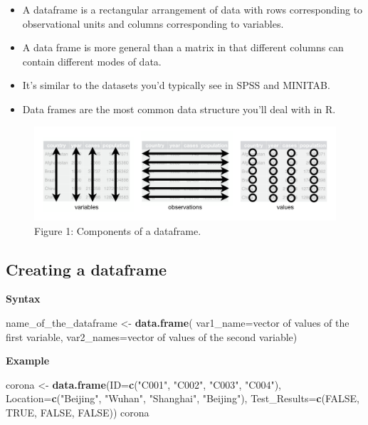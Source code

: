 \documentclass[
]{book}
\newenvironment{Shaded}{\begin{snugshade}}{\end{snugshade}}
\newcommand{\DataTypeTok}[1]{\textcolor[rgb]{0.13,0.29,0.53}{#1}}
\newcommand{\KeywordTok}[1]{\textcolor[rgb]{0.13,0.29,0.53}{\textbf{#1}}}
\newcommand{\NormalTok}[1]{#1}
\newcommand{\OtherTok}[1]{\textcolor[rgb]{0.56,0.35,0.01}{#1}}
\newcommand{\StringTok}[1]{\textcolor[rgb]{0.31,0.60,0.02}{#1}}
\begin{document}
\begin{itemize}
\item
  A dataframe is a rectangular arrangement of data with rows corresponding to observational units and columns corresponding to variables.
\item
  A data frame is more general than a matrix in that different columns can contain different modes of data.
\item
  It's similar to the datasets you'd typically see in SPSS and MINITAB.
\item
  Data frames are the most common data structure you'll deal with in R.
\end{itemize}

\begin{figure}
\centering
\includegraphics{tidy-1.png}
\caption{Figure 1: Components of a dataframe.}
\end{figure}

\hypertarget{creating-a-dataframe}{%
\subsection{Creating a dataframe}\label{creating-a-dataframe}}

\textbf{Syntax}

\begin{Shaded}
\begin{Highlighting}[]
\NormalTok{name_of_the_dataframe <-}\StringTok{ }\KeywordTok{data.frame}\NormalTok{(}
                          \DataTypeTok{var1_name=}\NormalTok{vector of values of the first variable,}
                          \DataTypeTok{var2_names=}\NormalTok{vector of values of the second variable)}
\end{Highlighting}
\end{Shaded}

\textbf{Example}

\begin{Shaded}
\begin{Highlighting}[]
\NormalTok{corona <-}\StringTok{ }\KeywordTok{data.frame}\NormalTok{(}\DataTypeTok{ID=}\KeywordTok{c}\NormalTok{(}\StringTok{"C001"}\NormalTok{, }\StringTok{"C002"}\NormalTok{, }\StringTok{"C003"}\NormalTok{, }\StringTok{"C004"}\NormalTok{),}
                     \DataTypeTok{Location=}\KeywordTok{c}\NormalTok{(}\StringTok{"Beijing"}\NormalTok{, }\StringTok{"Wuhan"}\NormalTok{, }\StringTok{"Shanghai"}\NormalTok{, }\StringTok{"Beijing"}\NormalTok{),}
                     \DataTypeTok{Test_Results=}\KeywordTok{c}\NormalTok{(}\OtherTok{FALSE}\NormalTok{, }\OtherTok{TRUE}\NormalTok{, }\OtherTok{FALSE}\NormalTok{, }\OtherTok{FALSE}\NormalTok{))}
\NormalTok{corona}
\end{Highlighting}
\end{Shaded}
\end{document}
